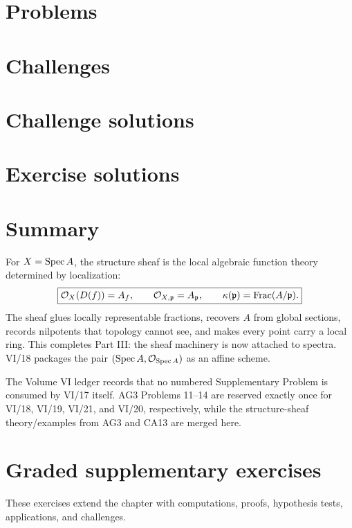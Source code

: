 \section{Problems}


\section{Challenges}

\ifdefined\IncludeChallengeSolutions
\section{Challenge solutions}

\fi

\ifdefined\IncludeExerciseSolutions
\section{Exercise solutions}

\fi

\section*{Summary}

For $X=\operatorname{Spec} A$, the structure sheaf is the local algebraic function theory determined by
localization:
\[
\boxed{\mathcal O_X(D(f))=A_f,\qquad \mathcal O_{X,\mathfrak p}=A_{\mathfrak p},\qquad
\kappa(\mathfrak p)=\operatorname{Frac}(A/\mathfrak p).}
\]
The sheaf glues locally representable fractions, recovers $A$ from global sections, records
nilpotents that topology cannot see, and makes every point carry a local ring.  This completes
Part III: the sheaf machinery is now attached to spectra.  VI/18 packages the pair
$(\operatorname{Spec} A,\mathcal O_{\operatorname{Spec} A})$ as an affine scheme.

The Volume VI ledger records that no numbered Supplementary Problem is consumed by VI/17 itself.
AG3 Problems 11--14 are reserved exactly once for VI/18, VI/19, VI/21, and VI/20,
respectively, while the structure-sheaf theory/examples from AG3 and CA13 are merged here.
\section{Graded supplementary exercises}
These exercises extend the chapter with computations, proofs, hypothesis tests, applications, and challenges.

